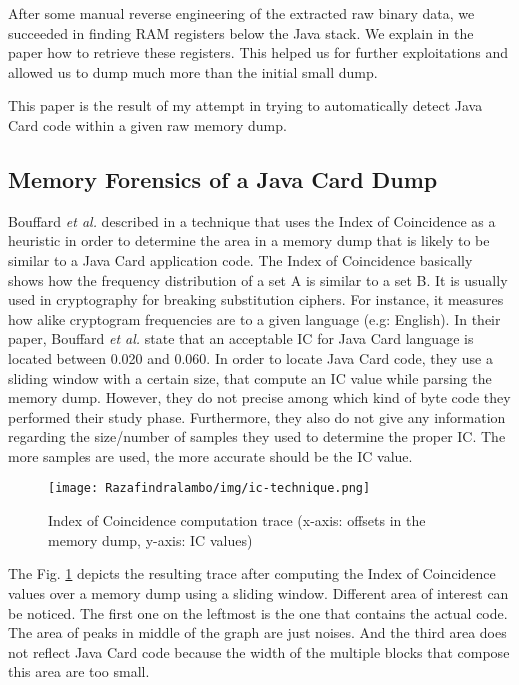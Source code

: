 After some manual reverse engineering of the extracted raw binary data, we succeeded in finding RAM
registers below the Java stack. We explain in the paper how to retrieve these registers. This helped us
for further exploitations and allowed us to dump much more than the initial small dump. 

This paper is the result of my attempt in trying to automatically detect Java Card code
within a given raw memory dump.

\subsection{Memory Forensics of a Java Card Dump}
\label{subsection:memforensics}
Bouffard \textit{et al.} described in \cite{conf/cardis/LanetBLCMMF14} a technique that
 uses the Index of Coincidence as a heuristic in order to determine the area in a memory dump that
 is likely to be similar to a Java Card application code.
 The Index of Coincidence basically shows how the frequency distribution of a set A is similar to a
 set B. It is usually used in cryptography for breaking substitution ciphers. For instance, it
 measures how alike cryptogram frequencies are to a given language (e.g: English). In their paper,
 Bouffard \textit{et al.}  state that an acceptable IC for Java Card language is located between
 0.020 and 0.060.  In order to locate Java Card code, they use a sliding window with a certain size,
 that compute an IC value while parsing the memory dump.
However, they do not precise among which kind of byte code they performed their study phase.
Furthermore, they also do not give any information regarding the size/number of samples they used to
determine the proper IC. The more samples are used, the more accurate should be the IC value.


\begin{figure}[!h]
\center
    \texttt{[image: Razafindralambo/img/ic-technique.png]}
    \caption{Index of Coincidence computation trace (x-axis: offsets in the memory dump, y-axis: IC values)}
    \label{fig:ic-technique}
\end{figure}
The Fig. \ref{fig:ic-technique} depicts the resulting trace after computing the Index of
Coincidence values over a memory dump using a sliding window. Different area of interest can be noticed. The first one on the leftmost is the
one that contains the actual code. The area of peaks in middle of the graph are just noises. And the
third area does not reflect Java Card code because the width of the multiple blocks that compose this
area are too small.

